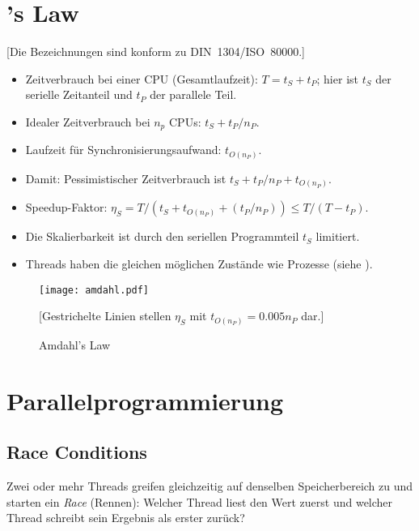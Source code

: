\section{\protect{}'s Law}

[Die Bezeichnungen sind konform zu DIN~1304/ISO~80000.]
\begin{itemize}
  \item Zeitverbrauch bei einer CPU (Gesamtlaufzeit): $T = t_S + t_P$; hier ist $t_S$ der serielle Zeitanteil und $t_P$ der parallele Teil.
  \item Idealer Zeitverbrauch bei $n_p$ CPUs: $t_S + t_P/n_P$.
  \item Laufzeit für Synchronisierungsaufwand: $t_{O(n_P)}$.
  \item Damit: Pessimistischer Zeitverbrauch ist $t_S + t_P/n_P + t_{O(n_P)}$.
  \item {}Speedup-Faktor: $\eta_S = T / (t_S + t_{O(n_P)} + (t_P / n_P)) \leq T / (T-t_P)$.
  \item {} Die Skalierbarkeit ist durch den seriellen Programmteil $t_S$ limitiert.
  \item Threads haben die gleichen möglichen Zustände wie Prozesse (siehe ).
\end{itemize}

\begin{figure}[htb]
\centering\texttt{[image: amdahl.pdf]}

{\small[Gestrichelte Linien stellen $\eta_S$ mit $t_{O(n_P)} = 0.005 n_P$ dar.]}

\caption{Amdahl's Law}
\end{figure}

\section{Parallelprogrammierung}



\subsection{Race Conditions}

Zwei oder mehr Threads greifen gleichzeitig auf denselben Speicherbereich zu und starten ein \emph{Race} (Rennen): Welcher Thread liest den Wert zuerst und welcher Thread schreibt sein Ergebnis als erster zurück?

